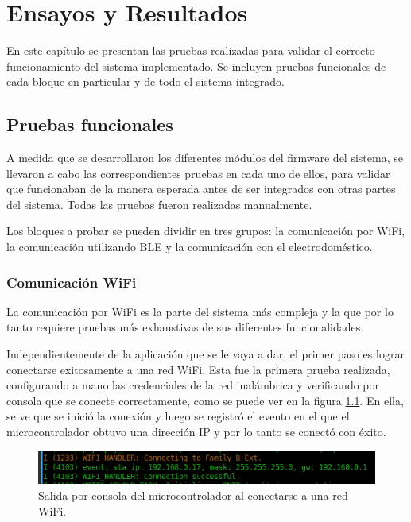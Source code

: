 
\chapter{Ensayos y Resultados} %
\label{Chapter4}

En este capítulo se presentan las pruebas realizadas para validar el correcto funcionamiento del sistema implementado. Se incluyen pruebas funcionales de cada bloque en particular y de todo el sistema integrado.

\section{Pruebas funcionales}

A medida que se desarrollaron los diferentes módulos del firmware del sistema, se llevaron a cabo las correspondientes pruebas en cada uno de ellos, para validar que funcionaban de la manera esperada antes de ser integrados con otras partes del sistema. Todas las pruebas fueron realizadas manualmente.

Los bloques a probar se pueden dividir en tres grupos: la comunicación por WiFi, la comunicación utilizando BLE y la comunicación con el electrodoméstico.

\subsection{Comunicación WiFi}

La comunicación por WiFi es la parte del sistema más compleja y la que por lo tanto requiere pruebas más exhaustivas de sus diferentes funcionalidades.

Independientemente de la aplicación que se le vaya a dar, el primer paso es lograr conectarse exitosamente a una red WiFi. Esta fue la primera prueba realizada, configurando a mano las credenciales de la red inalámbrica y verificando por consola que se conecte correctamente, como se puede ver en la figura \ref{fig:output_wifi_connection}. En ella, se ve que se inició la conexión y luego se registró el evento en el que el microcontrolador obtuvo una dirección IP y por lo tanto se conectó con éxito.

\begin{figure}[h]
\centering
\includegraphics[width=\textwidth]{./Figures/output_wifi_connection.png}
\caption{Salida por consola del microcontrolador al conectarse a una red WiFi.}
\label{fig:output_wifi_connection}
\end{figure}

